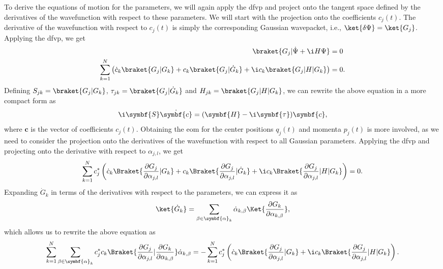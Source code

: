 To derive the equations of motion for the parameters, we will again apply the \acrshort{dfvp} and project onto the tangent space defined by the derivatives of the wavefunction with respect to these parameters. We will start with the projection onto the coefficients $c_j(t)$. The derivative of the wavefunction with respect to $c_j(t)$ is simply the corresponding Gaussian wavepacket, i.e., $\ket{\delta\Psi}=\ket{G_j}$. Applying the \acrshort{dfvp}, we get
\begin{align}
\braket{G_j|\dot\Psi+\i H\Psi}&=0\\
\sum_{k=1}^N\left(\dot c_k\braket{G_j|G_k}+c_k\braket{G_j|\dot G_k}+\i c_k\braket{G_j|H|G_k}\right)&=0.
\end{align}
Defining $S_{jk}=\braket{G_j|G_k}$, $\tau_{jk}=\braket{G_j|\dot G_k}$ and $H_{jk}=\braket{G_j|H|G_k}$, we can rewrite the above equation in a more compact form as
\begin{equation}
\i\symbf{S}\dot{\symbf{c}}=(\symbf{H}-\i\symbf{\tau})\symbf{c},
\end{equation}
where $\symbf{c}$ is the vector of coefficients $c_j(t)$. Obtaining the \acrshort{eom} for the center positions $q_j(t)$ and momenta $p_j(t)$ is more involved, as we need to consider the projection onto the derivatives of the wavefunction with respect to all Gaussian parameters. Applying the \acrshort{dfvp} and projecting onto the derivative with respect to $\alpha_{j,l}$, we get
\begin{equation}
\sum_{k=1}^Nc_j^\ast\left(\dot c_k\Braket{\frac{\partial G_j}{\partial\alpha_{j,l}}|G_k}+c_k\Braket{\frac{\partial G_j}{\partial \alpha_{j,l}}|\dot G_k}+\i c_k\Braket{\frac{\partial G_j}{\partial \alpha_{j,l}}|H|G_k}\right)=0.
\end{equation}
Expanding $\dot G_k$ in terms of the derivatives with respect to the parameters, we can express it as
\begin{equation}
\ket{\dot G_k}=\sum_{\beta\in\symbf{\alpha}_k}\dot\alpha_{k,\beta}\Ket{\frac{\partial G_k}{\partial \alpha_{k,\beta}}},
\end{equation}
which allows us to rewrite the above equation as
\begin{equation}
\sum_{k=1}^N\sum_{\beta\in\symbf{\alpha}_k}c_j^\ast c_k\Braket{\frac{\partial G_j}{\partial\alpha_{j,l}}|\frac{\vphantom{G_j}\partial G_k}{\partial\alpha_{k,\beta}}}\dot\alpha_{k,\beta}=-\sum_{k=1}^Nc_j^\ast\left(\dot c_k\Braket{\frac{\partial G_j}{\partial\alpha_{j,l}}|G_k}+\i c_k\Braket{\frac{\partial G_j}{\partial\alpha_{j,l}}|H|G_k}\right).
\end{equation}
